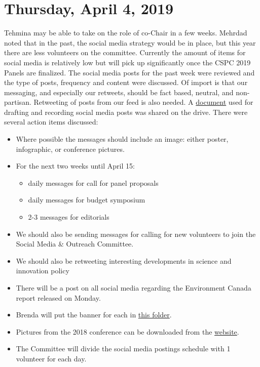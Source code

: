 \documentclass[12pt]{amsart}
\begin{document}
\section{Thursday, April 4, 2019}\label{mgt03}%
Tehmina may be able to take on the role of co-Chair in a few weeks.
Mehrdad noted that in the past, the social media strategy would be in place, but this year there are less volunteers on the committee.
Currently the amount of items for social media is relatively low but will pick up significantly once the CSPC 2019 Panels are finalized.
The social media posts for the past week were reviewed and the type of posts, frequency and content were discussed.
Of import is that our messaging, and especially our retweets, should be fact based, neutral, and non-partisan.
Retweeting of posts from our feed is also needed.
A \href{https://drive.google.com/open?id=1rrq5VrNb8jYogH0FOZP76n3koRmJKfNqVeFVJnFQLDM}{document} used for drafting and recording social media posts was shared on the drive.
There were several action items discussed:
\begin{itemize}
\item Where possible the messages should include an image: either poster, infographic, or conference pictures.
\item For the next two weeks until April 15:
\begin{itemize}
	\item daily messages for call for panel proposals 
	\item daily messages for budget symposium
	\item 2-3 messages for editorials
\end{itemize}
\item We should also be sending messages for calling for new volunteers to join the Social Media \& Outreach Committee.
\item We should also be retweeting interesting developments in science and innovation policy
\item There will be a post on all social media regarding the Environment Canada report released on Monday.
\item Brenda will put the banner for each in \href{https://drive.google.com/open?id=14IQquZwG4s8bjI-TdxFss1Dqcx8rVPkr}{this folder}.
\item Pictures from the 2018 conference can be downloaded from the \href{https://sciencepolicy.ca/cspc-2018-photos}{website}.
\item The Committee will divide the social media postings schedule with 1 volunteer for each day.
\end{itemize}
\end{document}
